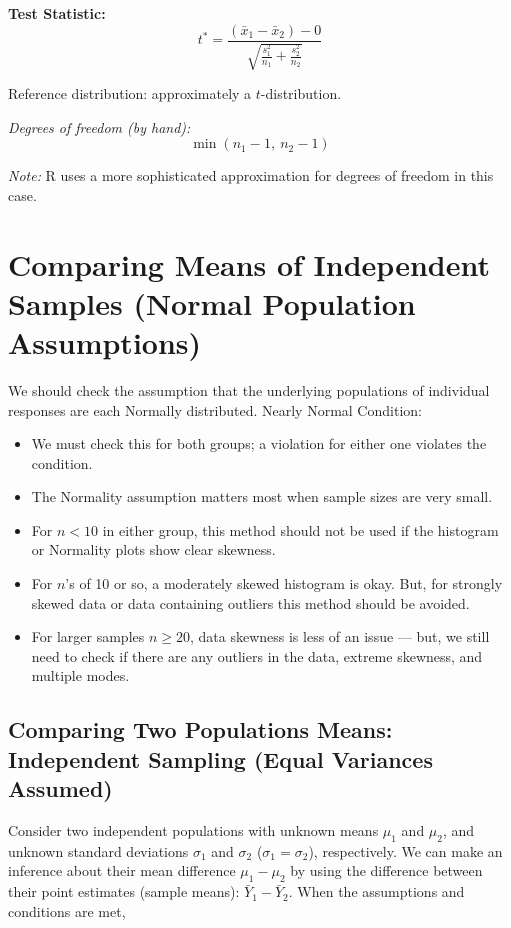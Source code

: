 \textbf{Test Statistic:}
\[
t^* = \frac{(\bar{x}_1 - \bar{x}_2) - 0}{\sqrt{\frac{s_1^2}{n_1} + \frac{s_2^2}{n_2}}}
\]

Reference distribution: approximately a $t$-distribution.

\vspace{0.5em}
\textit{Degrees of freedom (by hand):}
\[
\min(n_1 - 1,\ n_2 - 1)
\]

\textit{Note:} R uses a more sophisticated approximation for degrees of freedom in this case.
\section*{Comparing Means of Independent Samples (Normal Population Assumptions)}

We should check the assumption that the underlying populations of individual responses are each Normally distributed. Nearly Normal Condition:

\begin{itemize}
  \item We must check this for both groups; a violation for either one violates the condition.
  \item The Normality assumption matters most when sample sizes are very small.
  \item For $n < 10$ in either group, this method should not be used if the histogram or Normality plots show clear skewness.
  \item For $n$’s of 10 or so, a moderately skewed histogram is okay. But, for strongly skewed data or data containing outliers this method should be avoided.
  \item For larger samples $n \geq 20$, data skewness is less of an issue — but, we still need to check if there are any outliers in the data, extreme skewness, and multiple modes.
\end{itemize}
\subsection{Comparing Two Populations Means: Independent Sampling (Equal Variances Assumed)}

Consider two independent populations with unknown means $\mu_1$ and $\mu_2$, and unknown standard deviations $\sigma_1$ and $\sigma_2$ ($\sigma_1 = \sigma_2$), respectively. We can make an inference about their mean difference $\mu_1 - \mu_2$ by using the difference between their point estimates (sample means): $\bar{Y}_1 - \bar{Y}_2$. When the assumptions and conditions are met,


